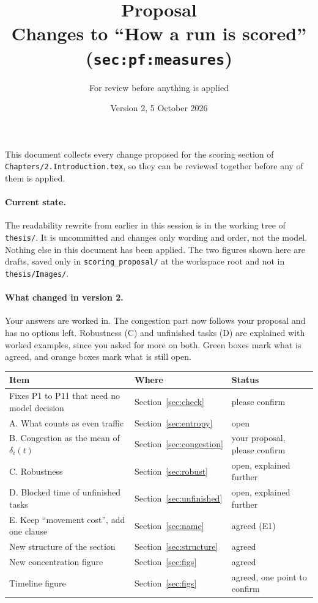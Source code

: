 \documentclass[11pt,a4paper]{article}
\title{Proposal\\[2pt]\large Changes to ``How a run is scored'' (\texttt{sec:pf:measures})}
\author{For review before anything is applied}
\date{Version 2, 5 October 2026}
\begin{document}
\sloppy
\maketitle

\noindent This document collects every change proposed for the scoring
section of \texttt{Chapters/2.Introduction.tex}, so they can be reviewed
together before any of them is applied.

\paragraph{Current state.} The readability rewrite from earlier in this
session is in the working tree of \texttt{thesis/}. It is uncommitted and
changes only wording and order, not the model. Nothing else in this
document has been applied. The two figures shown here are drafts, saved
only in \texttt{scoring\_proposal/} at the workspace root and not in
\texttt{thesis/Images/}.

\paragraph{What changed in version 2.} Your answers are worked in. The
congestion part now follows your proposal and has no options left.
Robustness (C) and unfinished tasks (D) are explained with worked
examples, since you asked for more on both. Green boxes mark what is
agreed, and orange boxes mark what is still open.

\begin{center}
\begin{tabular}{lll}
  \toprule
  Item & Where & Status \\
  \midrule
  Fixes P1 to P11 that need no model decision & Section~\ref{sec:check} & please confirm \\
  A. What counts as even traffic & Section~\ref{sec:entropy} & open \\
  B. Congestion as the mean of $\delta_i(t)$ & Section~\ref{sec:congestion} & your proposal, please confirm \\
  C. Robustness & Section~\ref{sec:robust} & open, explained further \\
  D. Blocked time of unfinished tasks & Section~\ref{sec:unfinished} & open, explained further \\
  E. Keep ``movement cost'', add one clause & Section~\ref{sec:name} & agreed (E1) \\
  New structure of the section & Section~\ref{sec:structure} & agreed \\
  New concentration figure & Section~\ref{sec:figs} & agreed \\
  Timeline figure & Section~\ref{sec:figs} & agreed, one point to confirm \\
  \bottomrule
\end{tabular}
\end{center}
\end{document}
